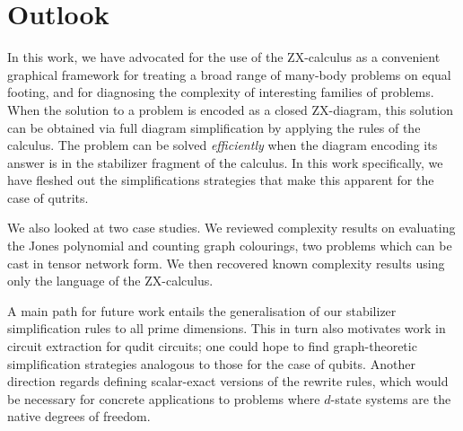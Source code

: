 \section{Outlook}

In this work, we have advocated for the use of the ZX-calculus
as a convenient graphical framework for treating a broad range of many-body problems on equal footing, and for diagnosing the complexity of interesting families of problems.
When the solution to a problem is encoded as a closed ZX-diagram,
this solution can be obtained via full diagram simplification by applying the rules of the calculus.
The problem can be solved \emph{efficiently} when the diagram encoding its answer is in the stabilizer fragment of the calculus.
In this work specifically, we have fleshed out the simplifications strategies that make this apparent for the case of qutrits.

We also looked at two case studies.
We reviewed complexity results on evaluating the Jones polynomial and counting graph colourings, two problems which can be cast in tensor network form.
We then recovered known complexity results using only the language of the ZX-calculus.

A main path for future work entails the generalisation
of our stabilizer simplification rules to all prime dimensions.
This in turn also motivates work in circuit extraction \cite{backens2020again} for qudit circuits; one could hope to find graph-theoretic simplification \cite{graph_theoretic_simplification} strategies analogous to those for the case of qubits.
Another direction regards defining scalar-exact versions of the rewrite rules, which would be necessary for concrete applications to problems where $d$-state systems are the native degrees of freedom.

